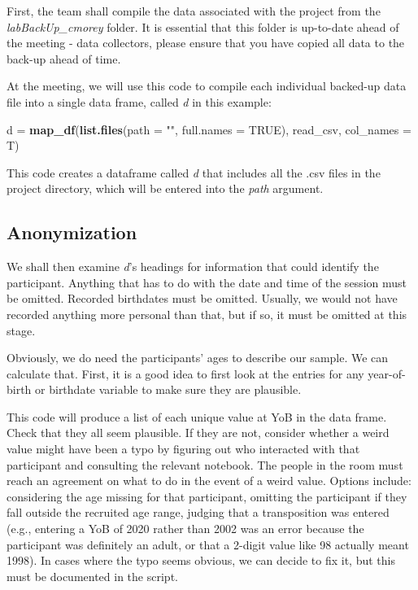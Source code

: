 \documentclass[
  12pt,
]{book}
\newenvironment{Shaded}{\begin{snugshade}}{\end{snugshade}}
\newcommand{\AttributeTok}[1]{\textcolor[rgb]{0.13,0.29,0.53}{#1}}
\newcommand{\ConstantTok}[1]{\textcolor[rgb]{0.56,0.35,0.01}{#1}}
\newcommand{\FunctionTok}[1]{\textcolor[rgb]{0.13,0.29,0.53}{\textbf{#1}}}
\newcommand{\NormalTok}[1]{#1}
\newcommand{\OtherTok}[1]{\textcolor[rgb]{0.56,0.35,0.01}{#1}}
\newcommand{\SpecialCharTok}[1]{\textcolor[rgb]{0.81,0.36,0.00}{\textbf{#1}}}
\newcommand{\StringTok}[1]{\textcolor[rgb]{0.31,0.60,0.02}{#1}}
\begin{document}
First, the team shall compile the data associated with the project from the \emph{labBackUp\_cmorey} folder. It is essential that this folder is up-to-date ahead of the meeting - data collectors, please ensure that you have copied all data to the back-up ahead of time.

At the meeting, we will use this code to compile each individual backed-up data file into a single data frame, called \emph{d} in this example:

\begin{Shaded}
\begin{Highlighting}[]
\NormalTok{d }\OtherTok{=} \FunctionTok{map\_df}\NormalTok{(}\FunctionTok{list.files}\NormalTok{(}\AttributeTok{path =} \StringTok{""}\NormalTok{, }\AttributeTok{full.names =} \ConstantTok{TRUE}\NormalTok{), }
\NormalTok{                 read\_csv, }\AttributeTok{col\_names =}\NormalTok{ T)}
\end{Highlighting}
\end{Shaded}

This code creates a dataframe called \emph{d} that includes all the .csv files in the project directory, which will be entered into the \emph{path} argument.

\subsection{Anonymization}\label{anonymization}

We shall then examine \emph{d}'s headings for information that could identify the participant. Anything that has to do with the date and time of the session must be omitted. Recorded birthdates must be omitted. Usually, we would not have recorded anything more personal than that, but if so, it must be omitted at this stage.

Obviously, we do need the participants' ages to describe our sample. We can calculate that. First, it is a good idea to first look at the entries for any year-of-birth or birthdate variable to make sure they are plausible.

\begin{Shaded}
\end{Shaded}

This code will produce a list of each unique value at YoB in the data frame. Check that they all seem plausible. If they are not, consider whether a weird value might have been a typo by figuring out who interacted with that participant and consulting the relevant notebook. The people in the room must reach an agreement on what to do in the event of a weird value. Options include: considering the age missing for that participant, omitting the participant if they fall outside the recruited age range, judging that a transposition was entered (e.g., entering a YoB of 2020 rather than 2002 was an error because the participant was definitely an adult, or that a 2-digit value like 98 actually meant 1998). In cases where the typo seems obvious, we can decide to fix it, but this must be documented in the script.
\end{document}
